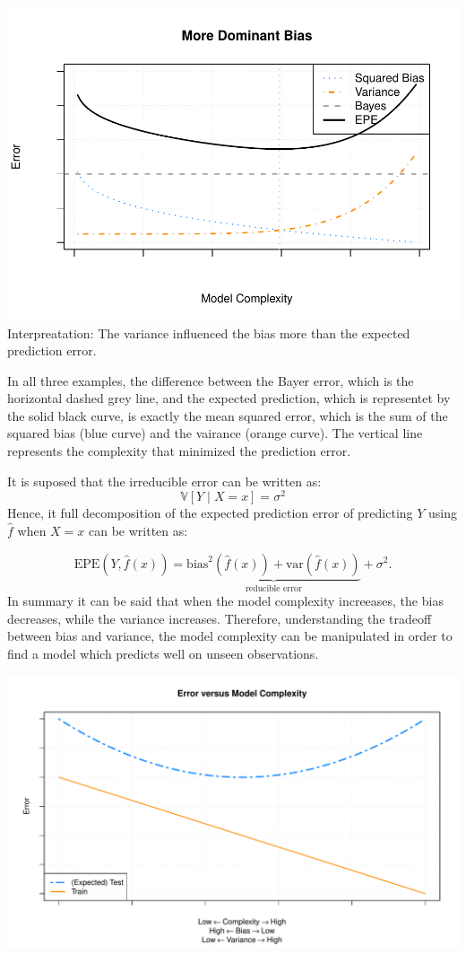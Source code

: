 \documentclass[]{report}
\begin{document}
\includegraphics{MyBook_files/figure-latex/unnamed-chunk-98-1.pdf}
Interpreatation: The variance influenced the bias more than the expected
prediction error.

In all three examples, the difference between the Bayer error, which is
the horizontal dashed grey line, and the expected prediction, which is
representet by the solid black curve, is exactly the mean squared error,
which is the sum of the squared bias (blue curve) and the vairance
(orange curve). The vertical line represents the complexity that
minimized the prediction error.

It is suposed that the irreducible error can be written as: \[
\mathbb{V}[Y \mid X = x] = \sigma ^ 2
\] Hence, it full decomposition of the expected prediction error of
predicting \(Y\) using \(\hat{f}\) when \(X = x\) can be written as:

\[
\text{EPE}\left(Y, \hat{f}(x)\right) =  
\underbrace{\text{bias}^2\left(\hat{f}(x)\right) + \text{var}\left(\hat{f}(x)\right)}_\textrm{reducible error} + \sigma^2.
\] In summary it can be said that when the model complexity increeases,
the bias decreases, while the variance increases. Therefore,
understanding the tradeoff between bias and variance, the model
complexity can be manipulated in order to find a model which predicts
well on unseen observations.

\includegraphics{MyBook_files/figure-latex/unnamed-chunk-99-1.pdf}
\end{document}
